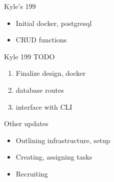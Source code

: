 
\begin{frame}{Kyle's 199}
    \begin{itemize}
        \item Initial docker, postgresql
        \item CRUD functions
    \end{itemize}    
\end{frame}

\begin{frame}{Kyle 199 TODO}
    \begin{enumerate}
        \item Finalize design, docker
        \item database routes
        \item interface with CLI
    \end{enumerate}
\end{frame}

\begin{frame}{Other updates}
    \begin{itemize}
        \item Outlining infrastructure, setup
        \item Creating, assigning tasks
        \item Recruiting
    \end{itemize}    
\end{frame}


